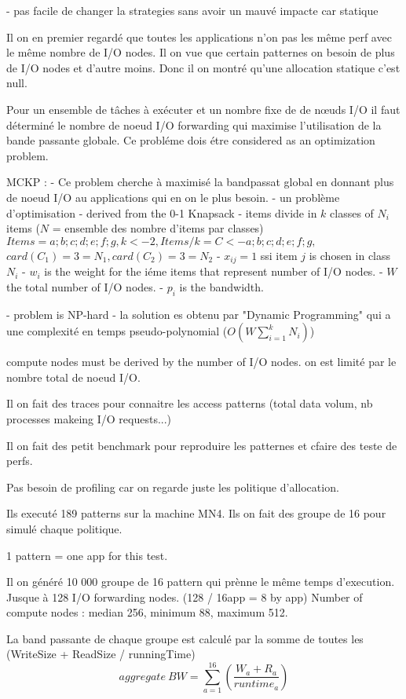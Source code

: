 \documentclass[10pt, a4paper]{article}
\begin{document}
- pas facile de changer la strategies sans avoir un mauvé impacte car statique

Il on en premier regardé que toutes les applications n'on pas les même perf avec le même nombre de I/O nodes. Il on vue que certain patternes on besoin de plus de I/O nodes et d'autre moins. Donc il on montré qu'une allocation statique c'est null.

Pour un ensemble de tâches à exécuter et un nombre fixe de de nœuds I/O il faut déterminé le nombre de noeud I/O forwarding qui maximise l'utilisation de la bande passante globale. Ce probléme dois étre considered as an optimization problem.

MCKP :
- Ce problem cherche à maximisé la bandpassat global en donnant plus de noeud I/O au applications qui en on le plus besoin.
- un problème d'optimisation
- derived from the 0-1 Knapsack
- items divide in $k$ classes of $N_i$ items
($N$ = ensemble des nombre d'items par classes)
$Items = {a; b; c; d; e; f; g}, k <- 2, Items/k = C <- {{a; b; c}; {d; e; f; g}},$
$card(C_1) = 3 = N_1, card(C_2) = 3 = N_2$
- $x_{ij} = 1$ ssi item $j$ is chosen in class $N_i$
- $w_i$ is the weight for the iéme items that represent number of I/O nodes.
- $W$ the total number of I/O nodes.
- $p_i$ is the bandwidth.

- problem is NP-hard
- la solution es obtenu par "Dynamic Programming" qui a une complexité en temps pseudo-polynomial ($O(W\sum^{k}_{i=1}N_i)$)


compute nodes must be derived by the number of I/O nodes.
on est limité par le nombre total de noeud I/O.

Il on fait des traces pour connaitre les access patterns (total data volum, nb processes makeing I/O requests...)

Il on fait des petit benchmark pour reproduire les patternes et cfaire des teste de perfs.

Pas besoin de profiling car on regarde juste les politique d'allocation.

Ils executé 189 patterns sur la machine MN4.
Ils on fait des groupe de 16 pour simulé chaque politique.

1 pattern = one app for this test.

Il on généré 10 000 groupe de 16 pattern qui prènne le même temps d'execution.
Jusque à 128 I/O forwarding nodes. (128 / 16app = 8 by app)
Number of compute nodes : median 256, minimum 88, maximum 512.

La band passante de chaque groupe est calculé par la somme de toutes les (WriteSize + ReadSize / runningTime)
\begin{equation*}aggregate\ BW=\sum_{a=1}^{16}\left(\frac{W_{a}+R_{a}}{runtime_{a}}\right) \tag{2}\end{equation*}
\end{document}
